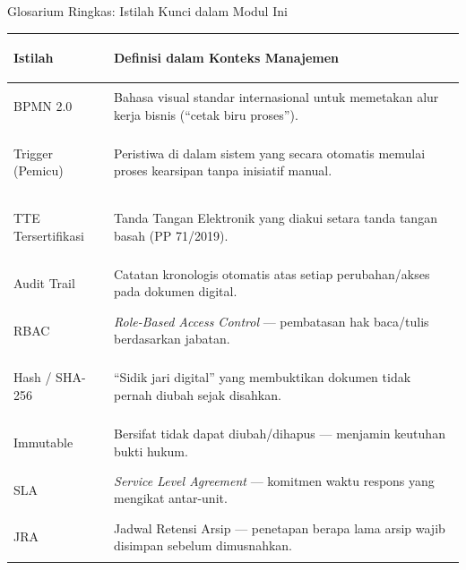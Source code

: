 \documentclass[aspectratio=169,11pt]{beamer}
\begin{document}
\begin{frame}{Glosarium Ringkas: Istilah Kunci dalam Modul Ini}
    \vspace{0.2cm}
    \begin{table}
        \centering
        \scriptsize
        \begin{tabularx}{\textwidth}{@{} >{\bfseries\raggedright\arraybackslash}p{3.2cm} X @{}}
            \toprule
            \textbf{Istilah} & \textbf{Definisi dalam Konteks Manajemen} \\
            \midrule
            BPMN 2.0 & Bahasa visual standar internasional untuk memetakan alur kerja bisnis (``cetak biru proses''). \\
            Trigger (Pemicu) & Peristiwa di dalam sistem yang secara otomatis memulai proses kearsipan tanpa inisiatif manual. \\
            TTE Tersertifikasi & Tanda Tangan Elektronik yang diakui setara tanda tangan basah (PP 71/2019). \\
            Audit Trail & Catatan kronologis otomatis atas setiap perubahan/akses pada dokumen digital. \\
            RBAC & \textit{Role-Based Access Control} --- pembatasan hak baca/tulis berdasarkan jabatan. \\
            Hash / SHA-256 & ``Sidik jari digital'' yang membuktikan dokumen tidak pernah diubah sejak disahkan. \\
            Immutable & Bersifat tidak dapat diubah/dihapus --- menjamin keutuhan bukti hukum. \\
            SLA & \textit{Service Level Agreement} --- komitmen waktu respons yang mengikat antar-unit. \\
            JRA & Jadwal Retensi Arsip --- penetapan berapa lama arsip wajib disimpan sebelum dimusnahkan. \\
            \bottomrule
        \end{tabularx}
    \end{table}
\end{frame}

\end{document}
